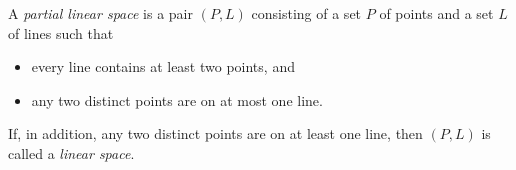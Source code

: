 \documentclass[12pt]{article}
\newcommand{\ti}[1]{\textit{#1}}
\begin{document}
A \ti{partial linear space} is a pair $(P,L)$ consisting of a set $P$ of points  and a set $L$ of lines such that
\begin{itemize}
\item every line \textrm{contains} at least two points, and
\item any two distinct points are on at most one line.
\end{itemize}
If, in \textrm{addition}, any two distinct points are on at least one line, then $(P,L)$ is called a \textit{linear space}.
\end{document}
